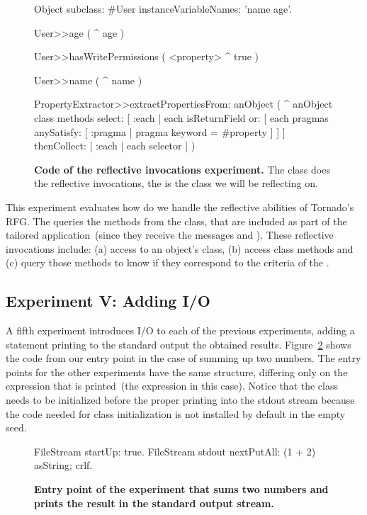 \begin{figure}[ht]
\small
\begin{code}
Object subclass: #User
	instanceVariableNames: 'name age'.

User>>age (
	^ age )

User>>hasWritePermissions (
	<property>
	^ true )

User>>name (
	^ name )

PropertyExtractor>>extractPropertiesFrom: anObject (
	^ anObject class methods
		select: [ :each | each isReturnField
			or: [ each pragmas anySatisfy: [ :pragma | pragma keyword = #property ] ] ]
		thenCollect: [ :each | each selector ] )

\end{code}
\caption{\small \textbf{Code of the reflective invocations experiment.} The  class does the reflective invocations, the  is the class we will be reflecting on.\label{fig:reflective_invocations}}
\end{figure}

This experiment evaluates how do we handle the reflective abilities of Tornado's RFG. The  queries the methods from the  class, that are included as part of the tailored application~(since they receive the messages  and ). These reflective invocations include: (a) access to an object's class, (b) access class methods and (c) query those methods to know if they correspond to the criteria of the .

\subsection{Experiment V: Adding I/O} \label{sec:results_helloworld}

A fifth experiment introduces I/O to each of the previous experiments, adding a statement printing to the standard output the obtained results. Figure~\ref{fig:hello_world_entry_point} shows the code from our entry point in the case of summing up two numbers. The entry points for the other experiments have the same structure, differing only on the expression that is printed~(the  expression in this case). Notice that the  class needs to be initialized before the proper printing into the stdout stream because the code needed for class initialization is not installed by default in the empty seed.

\begin{figure}[ht]
\small
\begin{code}
FileStream startUp: true.
FileStream stdout 
	nextPutAll: (1 + 2) asString;
	crlf.
\end{code}
\caption{\small \textbf{Entry point of the experiment that sums two numbers and prints the result in the standard output stream.}\label{fig:hello_world_entry_point}}
\end{figure}

